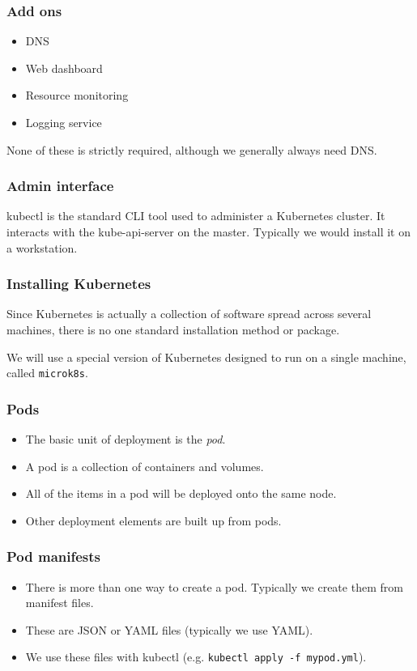 \documentclass[10pt]{beamer}
\begin{document}
\begin{frame}
  \frametitle{Add ons}
  
  \begin{itemize}
    \item DNS
    \item Web dashboard
    \item Resource monitoring
    \item Logging service
  \end{itemize}
  
  None of these is strictly required, although we generally always need DNS.
\end{frame}

\begin{frame}
  \frametitle{Admin interface}
  
  kubectl is the standard CLI tool used to administer a Kubernetes cluster. It interacts with the kube-api-server on the master. Typically we would install it on a workstation.
  
\end{frame}

\begin{frame}
  \frametitle{Installing Kubernetes}
  
  Since Kubernetes is actually a collection of software spread across several machines, there is no one standard installation method or package.
  
  We will use a special version of Kubernetes designed to run on a single machine, called \texttt{microk8s}.
  
\end{frame}

\begin{frame}
  \frametitle{Pods}
  
  \begin{itemize}
    \item The basic unit of deployment is the \emph{pod}.
    \item A pod is a collection of containers and volumes.
    \item All of the items in a pod will be deployed onto the same node.
    \item Other deployment elements are built up from pods.
  \end{itemize}
\end{frame}

\begin{frame}
  \frametitle{Pod manifests}
  
  \begin{itemize}
    \item There is more than one way to create a pod. Typically we create them from manifest files.
    \item These are JSON or YAML files (typically we use YAML).
    \item We use these files with kubectl (e.g. \texttt{kubectl apply -f mypod.yml}).
  \end{itemize}
\end{frame}
\end{document}
